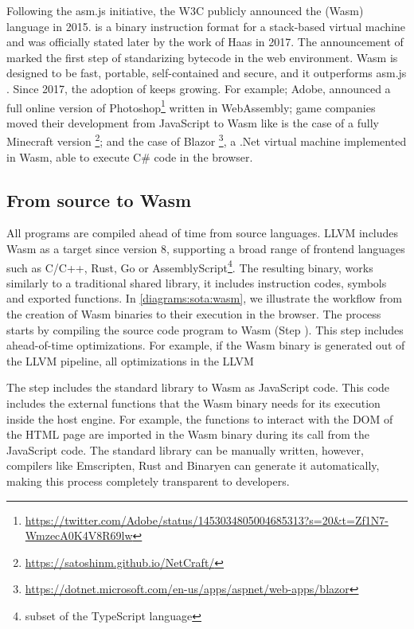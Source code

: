 Following the asm.js initiative, the W3C publicly announced the \wasm (Wasm) language in 2015. \wasm is a binary instruction format for a stack-based virtual machine and was officially stated later by the work of Haas \etal \cite{Haas_2017} in 2017. The announcement of \wasm marked the first step of standarizing bytecode in the web environment. Wasm is designed to be fast, portable, self-contained and secure, and it outperforms asm.js \cite{Haas_2017}. Since 2017, the adoption of \wasm keeps growing. For example; Adobe, announced a full online version of Photoshop\footnote{\url{https://twitter.com/Adobe/status/1453034805004685313?s=20&t=Zf1N7-WmzecA0K4V8R69lw}} written in WebAssembly;  game companies moved their development from JavaScript to Wasm like is the case of a fully Minecraft version \footnote{\url{https://satoshinm.github.io/NetCraft/}}; and the case of Blazor \footnote{\url{https://dotnet.microsoft.com/en-us/apps/aspnet/web-apps/blazor}}, a .Net virtual machine implemented in Wasm, able to execute C\# code in the browser.


\subsection*{From source to Wasm}

All \wasm programs are compiled ahead of time from source languages. LLVM includes Wasm as a target since version 8, supporting a broad range of frontend languages such as C/C++, Rust, Go or AssemblyScript\footnote{subset of the TypeScript language}. The resulting binary, works similarly to a traditional shared library, it includes instruction codes, symbols and exported functions. In \autoref{diagrams:sota:wasm}, we illustrate the workflow from the creation of Wasm binaries to their execution in the browser. The process starts by compiling the source code program to Wasm (Step ). This step includes ahead-of-time optimizations. For example, if the Wasm binary is generated out of the LLVM pipeline, all optimizations in the LLVM 


The step  includes the standard library to Wasm as JavaScript code. This code includes the external functions that the Wasm binary needs for its execution inside the host engine. For example, the functions to interact with the DOM of the HTML page are imported in the Wasm binary during its call from the JavaScript code. The standard library can be manually written, however, compilers like Emscripten, Rust and Binaryen can generate it automatically, making this process completely transparent to developers.

